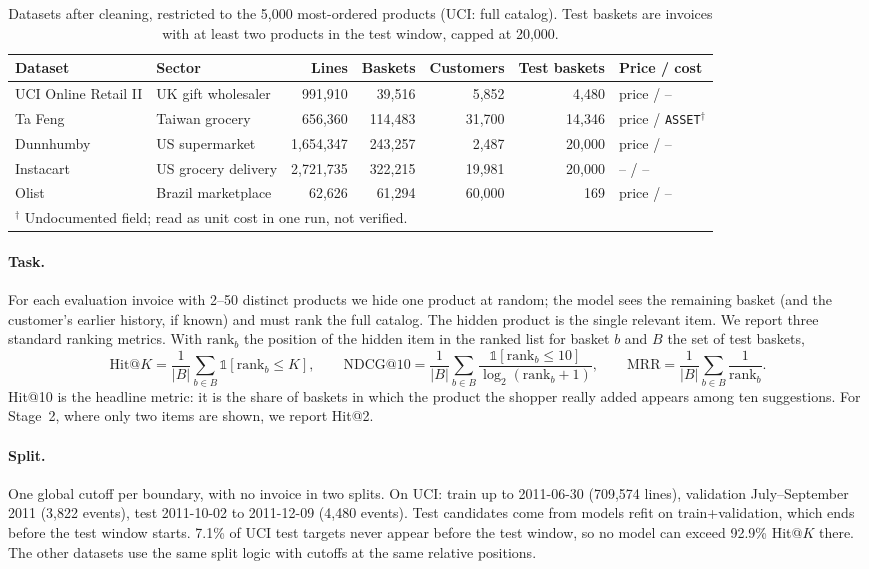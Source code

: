\documentclass[11pt]{article}
\begin{document}
\begin{table}[t]
\centering
\caption{Datasets after cleaning, restricted to the 5,000 most-ordered products (UCI: full catalog). Test baskets are invoices with at least two products in the test window, capped at 20,000.}
\label{tab:data}
\small
\begin{tabular}{llrrrrl}
\toprule
Dataset & Sector & Lines & Baskets & Customers & Test baskets & Price / cost \\
\midrule
UCI Online Retail II & UK gift wholesaler & 991,910 & 39,516 & 5,852 & 4,480 & price / -- \\
Ta Feng & Taiwan grocery & 656,360 & 114,483 & 31,700 & 14,346 & price / \texttt{ASSET}$^\dagger$ \\
Dunnhumby & US supermarket & 1,654,347 & 243,257 & 2,487 & 20,000 & price / -- \\
Instacart & US grocery delivery & 2,721,735 & 322,215 & 19,981 & 20,000 & -- / -- \\
Olist & Brazil marketplace & 62,626 & 61,294 & 60,000 & 169 & price / -- \\
\bottomrule
\multicolumn{7}{l}{\footnotesize $^\dagger$ Undocumented field; read as unit cost in one run, not verified.}
\end{tabular}
\end{table}

\paragraph{Task.}
For each evaluation invoice with 2--50 distinct products we hide one product at random; the model sees the remaining basket (and the customer's earlier history, if known) and must rank the full catalog.
The hidden product is the single relevant item.
We report three standard ranking metrics.
With $\mathrm{rank}_b$ the position of the hidden item in the ranked list for basket $b$ and $B$ the set of test baskets,
\begin{equation*}
\text{Hit@}K=\frac{1}{|B|}\sum_{b\in B}\mathbb{1}[\mathrm{rank}_b\le K],\qquad
\text{NDCG@10}=\frac{1}{|B|}\sum_{b\in B}\frac{\mathbb{1}[\mathrm{rank}_b\le 10]}{\log_2(\mathrm{rank}_b+1)},\qquad
\text{MRR}=\frac{1}{|B|}\sum_{b\in B}\frac{1}{\mathrm{rank}_b}.
\end{equation*}
Hit@10 is the headline metric: it is the share of baskets in which the product the shopper really added appears among ten suggestions.
For Stage~2, where only two items are shown, we report Hit@2.

\paragraph{Split.}
One global cutoff per boundary, with no invoice in two splits.
On UCI: train up to 2011-06-30 (709,574 lines), validation July--September 2011 (3,822 events), test 2011-10-02 to 2011-12-09 (4,480 events).
Test candidates come from models refit on train+validation, which ends before the test window starts.
7.1\% of UCI test targets never appear before the test window, so no model can exceed 92.9\% Hit@$K$ there.
The other datasets use the same split logic with cutoffs at the same relative positions.
\end{document}
